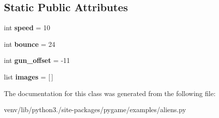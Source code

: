 \subsection*{Static Public Attributes}
\begin{DoxyCompactItemize}
\item 
\mbox{\label{classpygame_1_1examples_1_1aliens_1_1_player_a18c503f1d16ec5143a0192dda7a1ae1c}} 
int {\bfseries speed} = 10
\item 
\mbox{\label{classpygame_1_1examples_1_1aliens_1_1_player_aea231569a9847c8a8d80eb3d627cdf49}} 
int {\bfseries bounce} = 24
\item 
\mbox{\label{classpygame_1_1examples_1_1aliens_1_1_player_a82afb250422f9f1c0feb7412e22fdcf1}} 
int {\bfseries gun\+\_\+offset} = -\/11
\item 
\mbox{\label{classpygame_1_1examples_1_1aliens_1_1_player_ae97a29655707c7904f5d7fe593319852}} 
list {\bfseries images} = \mbox{[}$\,$\mbox{]}
\end{DoxyCompactItemize}


The documentation for this class was generated from the following file\+:\begin{DoxyCompactItemize}
\item 
venv/lib/python3./site-\/packages/pygame/examples/aliens.\+py\end{DoxyCompactItemize}
